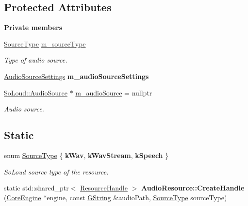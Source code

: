 \subsection*{Protected Attributes}
\begin{Indent}\textbf{ Private members}\par
\begin{DoxyCompactItemize}
\item 
\mbox{\label{classrev_1_1_audio_resource_a1569820bc8de0783e88b7b59281f319d}} 
\mbox{\hyperlink{classrev_1_1_audio_resource_a0793d33db36716e1ba7b283b6ded8707}{Source\+Type}} \mbox{\hyperlink{classrev_1_1_audio_resource_a1569820bc8de0783e88b7b59281f319d}{m\+\_\+source\+Type}}
\begin{DoxyCompactList}\small\item\em Type of audio source. \end{DoxyCompactList}\item 
\mbox{\label{classrev_1_1_audio_resource_aeb00de543329e23bad22a1aa64708fc4}} 
\mbox{\hyperlink{structrev_1_1_audio_source_settings}{Audio\+Source\+Settings}} {\bfseries m\+\_\+audio\+Source\+Settings}
\item 
\mbox{\hyperlink{class_so_loud_1_1_audio_source}{So\+Loud\+::\+Audio\+Source}} $\ast$ \mbox{\hyperlink{classrev_1_1_audio_resource_a072498f4a94de263c6ce3b2dc9e2d37c}{m\+\_\+audio\+Source}} = nullptr
\begin{DoxyCompactList}\small\item\em Audio source. \end{DoxyCompactList}\end{DoxyCompactItemize}
\end{Indent}
\subsection*{Static}
\begin{DoxyCompactItemize}
\item 
\mbox{\label{classrev_1_1_audio_resource_a0793d33db36716e1ba7b283b6ded8707}} 
enum \mbox{\hyperlink{classrev_1_1_audio_resource_a0793d33db36716e1ba7b283b6ded8707}{Source\+Type}} \{ {\bfseries k\+Wav}, 
{\bfseries k\+Wav\+Stream}, 
{\bfseries k\+Speech}
 \}
\begin{DoxyCompactList}\small\item\em So\+Loud source type of the resource. \end{DoxyCompactList}\item 
\mbox{\label{classrev_1_1_audio_resource_ac447c522f49cccc51d3b1ce90ebe182d}} 
static std\+::shared\+\_\+ptr$<$ \mbox{\hyperlink{classrev_1_1_resource_handle}{Resource\+Handle}} $>$ {\bfseries Audio\+Resource\+::\+Create\+Handle} (\mbox{\hyperlink{classrev_1_1_core_engine}{Core\+Engine}} $\ast$engine, const \mbox{\hyperlink{classrev_1_1_g_string}{G\+String}} \&audio\+Path, \mbox{\hyperlink{classrev_1_1_audio_resource_a0793d33db36716e1ba7b283b6ded8707}{Source\+Type}} source\+Type)
\end{DoxyCompactItemize}
